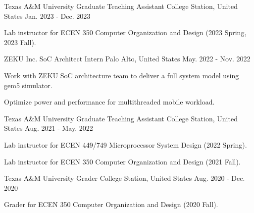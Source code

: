 
\begin{cventries}
    
    \cventry
    {Texas A\&M University} %
    {Graduate Teaching Assistant} %
    {College Station, United States} %
    {Jan. 2023 - Dec. 2023} %
    {
      \begin{cvitems} %
        \item {Lab instructor for ECEN 350 Computer Organization and Design (2023 Spring, 2023 Fall).}
      \end{cvitems}
    }
    
    \cventry
    {ZEKU Inc.} %
    {SoC Architect Intern} %
    {Palo Alto, United States} %
    {May. 2022 - Nov. 2022} %
    {
      \begin{cvitems} %
        \item {Work with ZEKU SoC architecture team to deliver a full system model using gem5 simulator.}
        \item {Optimize power and performance for multithreaded mobile workload.}        
      \end{cvitems}
    }
    
    \cventry
    {Texas A\&M University} %
    {Graduate Teaching Assistant} %
    {College Station, United States} %
    {Aug. 2021 - May. 2022} %
    {
      \begin{cvitems} %
        \item {Lab instructor for ECEN 449/749 Microprocessor System Design (2022 Spring).}
        \item {Lab instructor for ECEN 350 Computer Organization and Design (2021 Fall).}
      \end{cvitems}
    }
    
  \cventry
    {Texas A\&M University} %
    {Grader} %
    {College Station, United States} %
    {Aug. 2020 - Dec. 2020} %
    {
      \begin{cvitems} %
        \item {Grader for ECEN 350 Computer Organization and Design (2020 Fall).}
      \end{cvitems}
    }
    

\end{cventries}
